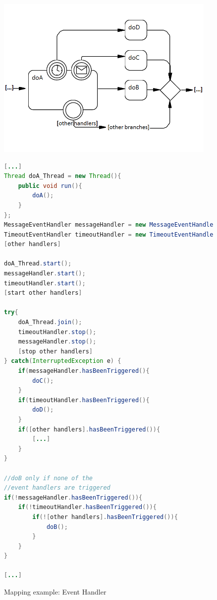 \begin{figure}[h]
\begin{minipage}[c]{0.45\textwidth}
	\includegraphics[width=0.95\textwidth]{images/mapping/event_handler.png}
\end{minipage}
\begin{minipage}[c]{0.55\textwidth}
\begin{lstlisting}[language=Java]
[...]
Thread doA_Thread = new Thread(){
	public void run(){
		doA();
	}
};
MessageEventHandler messageHandler = new MessageEventHandler(doA_Thread);
TimeoutEventHandler timeoutHandler = new TimeoutEventHandler(20000, doA_Thread);
[other handlers]

doA_Thread.start();
messageHandler.start();
timeoutHandler.start();
[start other handlers]

try{
	doA_Thread.join();
	timeoutHandler.stop();
	messageHandler.stop();
	[stop other handlers]
} catch(InterruptedException e) {
	if(messageHandler.hasBeenTriggered(){
		doC();
	}
	if(timeoutHandler.hasBeenTriggered(){
		doD();
	}
	if([other handlers].hasBeenTriggered()){
		[...]
	}
}

//doB only if none of the 
//event handlers are triggered
if(!messageHandler.hasBeenTriggered()){
	if(!timeoutHandler.hasBeenTriggered()){
		if(![other handlers].hasBeenTriggered()){	
			doB(); 
		}
	}
}

[...]
\end{lstlisting}
\end{minipage}
\caption{Mapping example: Event Handler}%
\label{fig:mapping_eventhandler}%
\end{figure}

